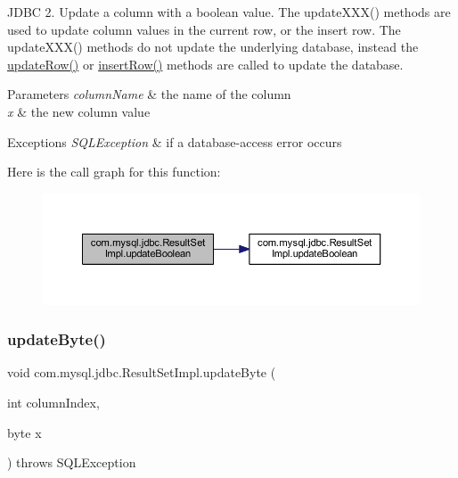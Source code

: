 J\+D\+BC 2. Update a column with a boolean value. The update\+X\+X\+X() methods are used to update column values in the current row, or the insert row. The update\+X\+X\+X() methods do not update the underlying database, instead the \mbox{\hyperlink{classcom_1_1mysql_1_1jdbc_1_1_result_set_impl_a2842d32292d023aaeeafedeed3322981}{update\+Row()}} or \mbox{\hyperlink{classcom_1_1mysql_1_1jdbc_1_1_result_set_impl_a78e304e3279cbcf60392f18c1385e3bf}{insert\+Row()}} methods are called to update the database.


\begin{DoxyParams}{Parameters}
{\em column\+Name} & the name of the column \\
\hline
{\em x} & the new column value\\
\hline
\end{DoxyParams}

\begin{DoxyExceptions}{Exceptions}
{\em S\+Q\+L\+Exception} & if a database-\/access error occurs \\
\hline
\end{DoxyExceptions}
Here is the call graph for this function\+:
\nopagebreak
\begin{figure}[H]
\begin{center}
\leavevmode
\includegraphics[width=350pt]{classcom_1_1mysql_1_1jdbc_1_1_result_set_impl_a94e7117ecf4f1109efc090bea53a95eb_cgraph}
\end{center}
\end{figure}
\mbox{\label{classcom_1_1mysql_1_1jdbc_1_1_result_set_impl_a259de718d0b71b68adc144272b315a24}} 
\subsubsection{\texorpdfstring{update\+Byte()}{updateByte()}\hspace{0.1cm}{\footnotesize\ttfamily [1/2]}}
{\footnotesize\ttfamily void com.\+mysql.\+jdbc.\+Result\+Set\+Impl.\+update\+Byte (\begin{DoxyParamCaption}\item[{int}]{column\+Index,  }\item[{byte}]{x }\end{DoxyParamCaption}) throws S\+Q\+L\+Exception}

